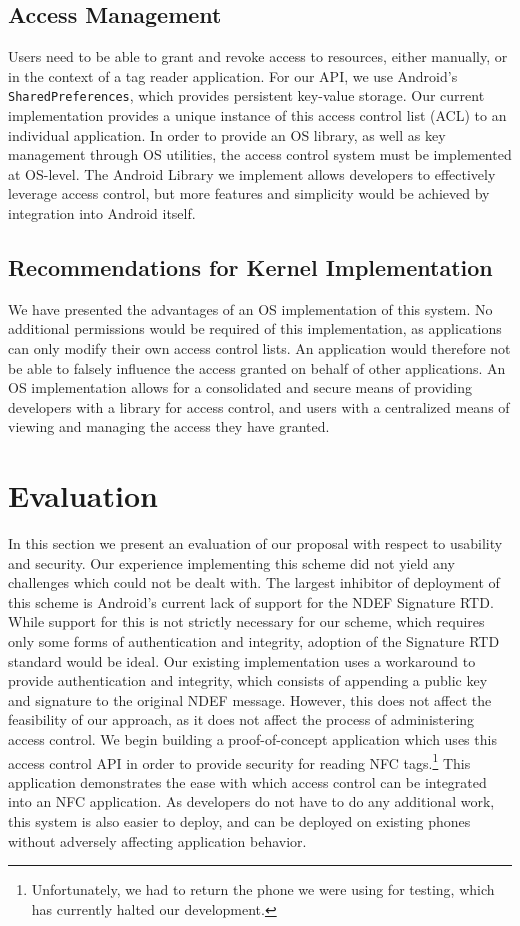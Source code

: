 \documentclass[12pt]{article}
\begin{document}
\subsection{Access Management}
Users need to be able to grant and revoke access to resources, either manually, or in the context of a tag reader application.
For our API, we use Android's \texttt{SharedPreferences}, which provides persistent key-value storage.
Our current implementation provides a unique instance of this access control list (ACL) to an individual application.
In order to provide an OS library, as well as key management through OS utilities, the access control system must be implemented at OS-level.
The Android Library we implement allows developers to effectively leverage access control, but more features and simplicity would be achieved by integration into Android itself.

\subsection{Recommendations for Kernel Implementation}
We have presented the advantages of an OS implementation of this system.
No additional permissions would be required of this implementation, as applications can only modify their own access control lists.
An application would therefore not be able to falsely influence the access granted on behalf of other applications.
An OS implementation allows for a consolidated and secure means of providing developers with a library for access control, and users with a centralized means of viewing and managing the access they have granted.

\section{Evaluation}
In this section we present an evaluation of our proposal with respect to usability and security.
Our experience implementing this scheme did not yield any challenges which could not be dealt with.
The largest inhibitor of deployment of this scheme is Android's current lack of support for the NDEF Signature RTD.
While support for this is not strictly necessary for our scheme, which requires only some forms of authentication and integrity, adoption of the Signature RTD standard would be ideal.
Our existing implementation uses a workaround to provide authentication and integrity, which consists of appending a public key and signature to the original NDEF message.
However, this does not affect the feasibility of our approach, as it does not affect the process of administering access control.
We begin building a proof-of-concept application which uses this access control API in order to provide security for reading NFC tags.\footnote{Unfortunately, we had to return the phone we were using for testing, which has currently halted our development.}
This application demonstrates the ease with which access control can be integrated into an NFC application.
As developers do not have to do any additional work, this system is also easier to deploy, and can be deployed on existing phones without adversely affecting application behavior.
\end{document}
